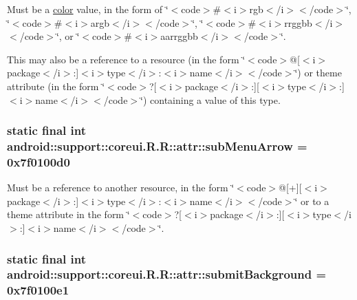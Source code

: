 Must be a \hyperlink{classandroid_1_1support_1_1coreui_1_1_r_1_1color}{color} value, in the form of \char`\"{}$<$code$>$\#$<$i$>$rgb$<$/i$>$$<$/code$>$\char`\"{}, \char`\"{}$<$code$>$\#$<$i$>$argb$<$/i$>$$<$/code$>$\char`\"{}, \char`\"{}$<$code$>$\#$<$i$>$rrggbb$<$/i$>$$<$/code$>$\char`\"{}, or \char`\"{}$<$code$>$\#$<$i$>$aarrggbb$<$/i$>$$<$/code$>$\char`\"{}. 

This may also be a reference to a resource (in the form \char`\"{}$<$code$>$@\mbox{[}$<$i$>$package$<$/i$>$:\mbox{]}$<$i$>$type$<$/i$>$:$<$i$>$name$<$/i$>$$<$/code$>$\char`\"{}) or theme attribute (in the form \char`\"{}$<$code$>$?\mbox{[}$<$i$>$package$<$/i$>$:\mbox{]}\mbox{[}$<$i$>$type$<$/i$>$:\mbox{]}$<$i$>$name$<$/i$>$$<$/code$>$\char`\"{}) containing a value of this type. \hypertarget{classandroid_1_1support_1_1coreui_1_1_r_1_1attr_00e79a01a554244c347494ff9fe48206}{
\subsubsection[{subMenuArrow}]{\setlength{\rightskip}{0pt plus 5cm}static final int android::support::coreui.R.R::attr::subMenuArrow = 0x7f0100d0}}
\label{classandroid_1_1support_1_1coreui_1_1_r_1_1attr_00e79a01a554244c347494ff9fe48206}


Must be a reference to another resource, in the form \char`\"{}$<$code$>$@\mbox{[}+\mbox{]}\mbox{[}$<$i$>$package$<$/i$>$:\mbox{]}$<$i$>$type$<$/i$>$:$<$i$>$name$<$/i$>$$<$/code$>$\char`\"{} or to a theme attribute in the form \char`\"{}$<$code$>$?\mbox{[}$<$i$>$package$<$/i$>$:\mbox{]}\mbox{[}$<$i$>$type$<$/i$>$:\mbox{]}$<$i$>$name$<$/i$>$$<$/code$>$\char`\"{}. \hypertarget{classandroid_1_1support_1_1coreui_1_1_r_1_1attr_02e27ba343098c12d34f54a52d5082a5}{
\subsubsection[{submitBackground}]{\setlength{\rightskip}{0pt plus 5cm}static final int android::support::coreui.R.R::attr::submitBackground = 0x7f0100e1}}
\label{classandroid_1_1support_1_1coreui_1_1_r_1_1attr_02e27ba343098c12d34f54a52d5082a5}


